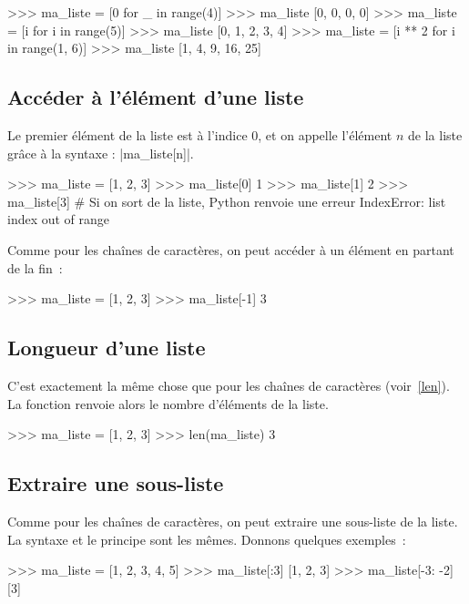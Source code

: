 		\begin{pythoncode}
			>>> ma_liste = [0 for _ in range(4)]
			>>> ma_liste
			[0, 0, 0, 0]
			>>> ma_liste = [i for i in range(5)]
			>>> ma_liste
			[0, 1, 2, 3, 4]
			>>> ma_liste = [i ** 2 for i in range(1, 6)]
			>>> ma_liste
			[1, 4, 9, 16, 25]
		\end{pythoncode}
		
	\subsection{Accéder à l'élément d'une liste}
		
		Le premier élément de la liste est à l'indice 0, et on appelle l'élément $n$ de la liste grâce à la syntaxe : \python|ma_liste[n]|.
		\begin{pythoncode}
			>>> ma_liste = [1, 2, 3]
			>>> ma_liste[0]
			1
			>>> ma_liste[1]
			2
			>>> ma_liste[3] # Si on sort de la liste, Python renvoie une erreur
			IndexError: list index out of range
		\end{pythoncode}
		
		Comme pour les chaînes de caractères, on peut accéder à un élément en partant de la fin~:
		\begin{pythoncode}
			>>> ma_liste = [1, 2, 3]
			>>> ma_liste[-1]
			3
		\end{pythoncode}
	
	\subsection{Longueur d'une liste}
		
		C'est exactement la même chose que pour les chaînes de caractères (voir~\ref{len}). La fonction renvoie alors le nombre d'éléments de la liste.
		
		\begin{pythoncode}
			>>> ma_liste = [1, 2, 3]
			>>> len(ma_liste)
			3
		\end{pythoncode}
	
	\subsection{Extraire une sous-liste} \label{slicing}
		
		Comme pour les chaînes de caractères, on peut extraire une sous-liste de la liste. La syntaxe et le principe sont les mêmes.
		Donnons quelques exemples~:
		
		\begin{pythoncode}
			>>> ma_liste = [1, 2, 3, 4, 5]
			>>> ma_liste[:3]
			[1, 2, 3]
			>>> ma_liste[-3: -2]
			[3]
		\end{pythoncode}
	
